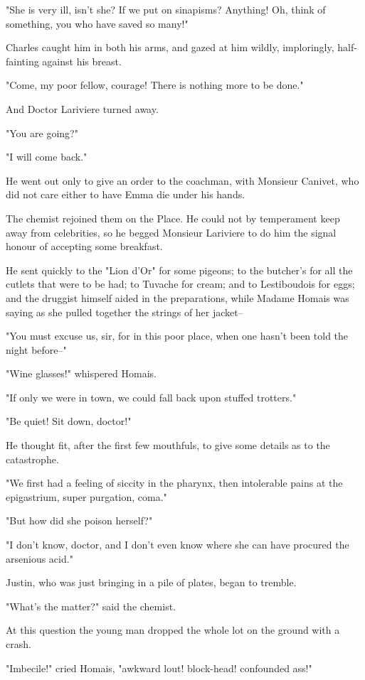 \documentclass[11pt,twocolumn]{ltugboat}
\begin{document}
"She is very ill, isn't she? If we put on sinapisms? Anything! Oh, think
of something, you who have saved so many!"

Charles caught him in both his arms, and gazed at him wildly,
imploringly, half-fainting against his breast.

"Come, my poor fellow, courage! There is nothing more to be done."

And Doctor Lariviere turned away.

"You are going?"

"I will come back."

He went out only to give an order to the coachman, with Monsieur
Canivet, who did not care either to have Emma die under his hands.

The chemist rejoined them on the Place. He could not by temperament keep
away from celebrities, so he begged Monsieur Lariviere to do him the
signal honour of accepting some breakfast.

He sent quickly to the "Lion d'Or" for some pigeons; to the butcher's
for all the cutlets that were to be had; to Tuvache for cream; and
to Lestiboudois for eggs; and the druggist himself aided in the
preparations, while Madame Homais was saying as she pulled together the
strings of her jacket--

"You must excuse us, sir, for in this poor place, when one hasn't been
told the night before--"

"Wine glasses!" whispered Homais.

"If only we were in town, we could fall back upon stuffed trotters."

"Be quiet! Sit down, doctor!"

He thought fit, after the first few mouthfuls, to give some details as
to the catastrophe.

"We first had a feeling of siccity in the pharynx, then intolerable
pains at the epigastrium, super purgation, coma."

"But how did she poison herself?"

"I don't know, doctor, and I don't even know where she can have procured
the arsenious acid."

Justin, who was just bringing in a pile of plates, began to tremble.

"What's the matter?" said the chemist.

At this question the young man dropped the whole lot on the ground with
a crash.

"Imbecile!" cried Homais, "awkward lout! block-head! confounded ass!"
\end{document}
